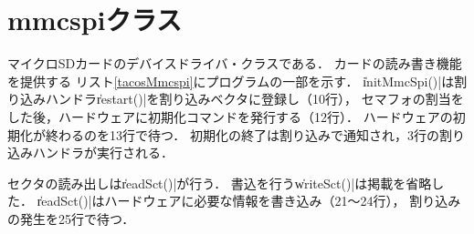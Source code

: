 \section{mmcspiクラス}
マイクロSDカードのデバイスドライバ・クラスである．
カードの読み書き機能を提供する
リスト\ref{tacosMmcspi}にプログラムの一部を示す．
\|initMmcSpi()|は割り込みハンドラ\|restart()|を割り込みベクタに登録し（10行），
セマフォの割当をした後，ハードウェアに初期化コマンドを発行する（12行）．
ハードウェアの初期化が終わるのを13行で待つ．
初期化の終了は割り込みで通知され，3行の割り込みハンドラが実行される．

  

セクタの読み出しは\|readSct()|が行う．
書込を行う\|writeSct()|は掲載を省略した．
\|readSct()|はハードウェアに必要な情報を書き込み（21〜24行），
割り込みの発生を25行で待つ．

